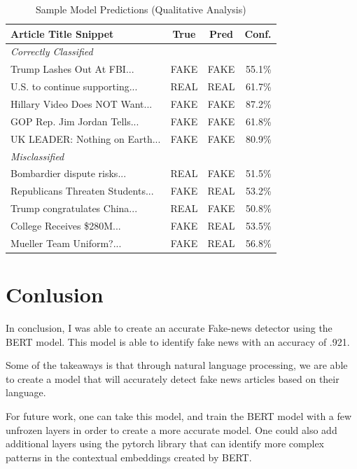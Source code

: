 \documentclass[conference]{IEEEtran}
\begin{document}
\begin{table}[ht]
\centering
\caption{Sample Model Predictions (Qualitative Analysis)}
\label{tab:predictions}
\footnotesize %
\begin{tabularx}{\columnwidth}{X c c r} %
\toprule
\textbf{Article Title Snippet} & \textbf{True} & \textbf{Pred} & \textbf{Conf.} \\ \midrule
\textit{Correctly Classified} & & & \\ \midrule
Trump Lashes Out At FBI... & FAKE & FAKE & 55.1\% \\
U.S. to continue supporting... & REAL & REAL & 61.7\% \\
Hillary Video Does NOT Want... & FAKE & FAKE & 87.2\% \\
GOP Rep. Jim Jordan Tells... & FAKE & FAKE & 61.8\% \\
UK LEADER: Nothing on Earth... & FAKE & FAKE & 80.9\% \\ \midrule
\textit{Misclassified} & & & \\ \midrule
Bombardier dispute risks... & REAL & FAKE & 51.5\% \\
Republicans Threaten Students... & FAKE & REAL & 53.2\% \\
Trump congratulates China... & REAL & FAKE & 50.8\% \\
College Receives \$280M... & FAKE & REAL & 53.5\% \\
Mueller Team Uniform?... & FAKE & REAL & 56.8\% \\ \bottomrule
\end{tabularx}
\end{table}

\section{Conlusion}
In conclusion, I was able to create an accurate Fake-news detector using the BERT model. This model is able to identify fake news with an accuracy of .921. 

Some of the takeaways is that through natural language processing, we are able to create a model that will accurately detect fake news articles based on their language. 

For future work, one can take this model, and train the BERT model with a few unfrozen layers in order to create a more accurate model. One could also add additional layers using the pytorch library that can identify more complex patterns in the contextual embeddings created by BERT.

\end{document}
